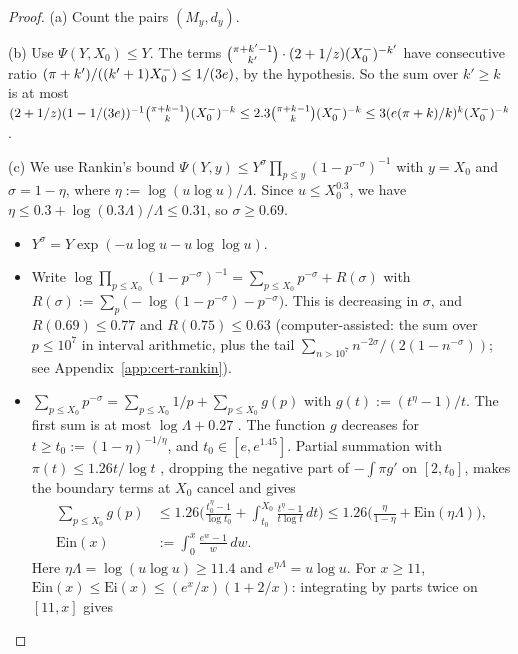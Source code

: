 \begin{proof}
(a) Count the pairs $(M_y,d_y)$.

(b) Use $\Psi(Y,X_0)\le Y$. The terms $\binom{\pi+k'-1}{k'}\cdot(2+1/z)(X_0^{-})^{-k'}$ have consecutive ratio
$(\pi+k')/((k'+1)X_0^{-})\le1/(3e)$, by the hypothesis. So the sum over $k'\ge k$ is at most
$(2+1/z)(1-1/(3e))^{-1}\binom{\pi+k-1}{k}(X_0^{-})^{-k}\le2.3\binom{\pi+k-1}{k}(X_0^{-})^{-k}\le3(e(\pi+k)/k)^k(X_0^{-})^{-k}$.

(c) We use Rankin's bound $\Psi(Y,y)\le Y^{\sigma}\prod_{p\le y}(1-p^{-\sigma})^{-1}$ with $y=X_0$ and $\sigma=1-\eta$, where
$\eta:=\log(u\log u)/\Lambda$. Since $u\le X_0^{0.3}$, we have $\eta\le0.3+\log(0.3\Lambda)/\Lambda\le0.31$, so $\sigma\ge0.69$.
\begin{itemize}
\item $Y^{\sigma}=Y\exp(-u\log u-u\log\log u)$.
\item Write $\log\prod_{p\le X_0}(1-p^{-\sigma})^{-1}=\sum_{p\le X_0}p^{-\sigma}+R(\sigma)$ with
  $R(\sigma):=\sum_p\big(-\log(1-p^{-\sigma})-p^{-\sigma}\big)$. This is decreasing in $\sigma$, and $R(0.69)\le0.77$ and
  $R(0.75)\le0.63$ (computer-assisted: the sum over $p\le10^7$ in interval arithmetic, plus the tail
  $\sum_{n>10^7}n^{-2\sigma}/(2(1-n^{-\sigma}))$; see Appendix~\ref{app:cert-rankin}).
\item $\sum_{p\le X_0}p^{-\sigma}=\sum_{p\le X_0}1/p+\sum_{p\le X_0}g(p)$ with $g(t):=(t^{\eta}-1)/t$. The first sum is at most
  $\log\Lambda+0.27$ \cite[Thm.~5, (3.18)]{RosserSchoenfeld1962}. The function $g$ decreases for $t\ge t_0:=(1-\eta)^{-1/\eta}$,
  and $t_0\in[e,e^{1.45}]$. Partial summation with $\pi(t)\le1.26t/\log t$ \cite[(3.6)]{RosserSchoenfeld1962}, dropping the
  negative part of $-\int\pi g'$ on $[2,t_0]$, makes the boundary terms at $X_0$ cancel and gives
  \begin{align*}
  \sum_{p\le X_0}g(p)&\le1.26\Big(\frac{t_0^{\eta}-1}{\log t_0}+\int_{t_0}^{X_0}\frac{t^{\eta}-1}{t\log t}\,dt\Big)
  \le1.26\Big(\frac{\eta}{1-\eta}+\mathrm{Ein}(\eta\Lambda)\Big),\\
  \mathrm{Ein}(x)&:=\int_0^x\frac{e^w-1}w\,dw.
  \end{align*}
  Here $\eta\Lambda=\log(u\log u)\ge11.4$ and $e^{\eta\Lambda}=u\log u$. For $x\ge11$,
  $\mathrm{Ein}(x)\le\mathrm{Ei}(x)\le(e^x/x)(1+2/x)$: integrating by parts twice on $[11,x]$ gives

\end{itemize}
\end{proof}
